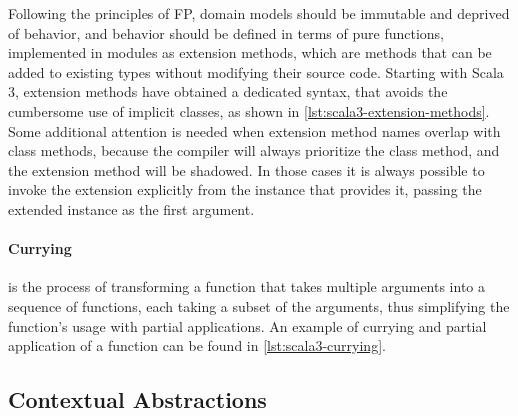 Following the principles of \ac{FP}, domain models should be immutable and deprived of behavior, and behavior should be defined in terms of pure functions, implemented in modules as extension methods, which are methods that can be added to existing types without modifying their source code.
%
Starting with Scala 3, extension methods have obtained a dedicated syntax, that avoids the cumbersome use of implicit classes, as shown in \cref{lst:scala3-extension-methods}.
%
Some additional attention is needed when extension method names overlap with class methods, because the compiler will always prioritize the class method, and the extension method will be shadowed.
%
In those cases it is always possible to invoke the extension explicitly from the instance that provides it, passing the extended instance as the first argument.



\paragraph{Currying} is the process of transforming a function that takes multiple arguments into a sequence of functions, each taking a subset of the arguments, thus simplifying the function's usage with partial applications.
%
An example of currying and partial application of a function can be found in \cref{lst:scala3-currying}.




\subsection{Contextual Abstractions} \label{chap:background->sec:scala3->subsec:contextual-abstractions}

